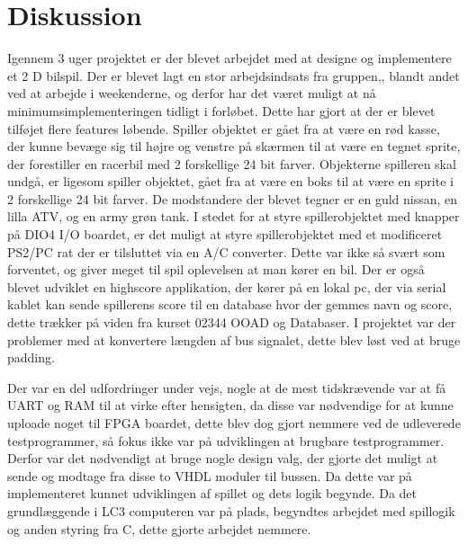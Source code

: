 \chapter{Diskussion}\label{cha:diskussion}

Igennem 3 uger projektet er der blevet arbejdet med at designe og implementere et 2 D bilspil. Der er blevet lagt en stor arbejdsindsats fra gruppen,, blandt andet ved at arbejde i weekenderne, og derfor har det været muligt at nå minimumsimplementeringen tidligt i forløbet. Dette har gjort at der er blevet tilføjet flere features løbende. Spiller objektet er gået fra at være en rød kasse, der kunne bevæge sig til højre og venstre på skærmen til at være en tegnet sprite, der forestiller en racerbil med 2 forskellige 24 bit farver. Objekterne spilleren skal undgå, er ligesom spiller objektet, gået fra at være en boks til at være en sprite i 2 forskellige 24 bit farver. De modstandere der blevet tegner er en guld nissan, en lilla ATV, og en army grøn tank.
 I stedet for at styre spillerobjektet med knapper på DIO4 I/O boardet, er det muligt at styre spillerobjektet med et modificeret PS2/PC rat der er tilsluttet via en A/C converter. Dette var ikke så svært som forventet, og giver meget til spil oplevelsen at man kører en bil.
  Der er også blevet udviklet en highscore applikation, der kører på en lokal pc, der via serial kablet kan sende spillerens score til en database hvor der gemmes navn og score, dette trækker på viden fra kurset 02344 OOAD og Databaser.
  I projektet var der problemer med at konvertere længden af bus signalet, dette blev løst ved at bruge padding.

 Der var en del udfordringer under vejs, nogle at de mest tidskrævende var at få UART og RAM til at virke efter hensigten, da disse var nødvendige for at kunne uploade noget til FPGA boardet, dette blev dog gjort nemmere ved de udleverede testprogrammer, så fokus ikke var på udviklingen at brugbare testprogrammer. Derfor var det nødvendigt at bruge nogle design valg, der gjorte det muligt at sende og modtage fra disse to VHDL moduler til bussen. Da dette var på implementeret kunnet udviklingen af spillet og dets logik begynde. 
 Da det grundlæggende i LC3 computeren var på plads, begyndtes arbejdet med spillogik og anden styring fra C, dette gjorte arbejdet nemmere. %
 


